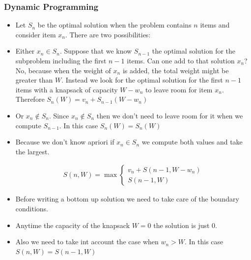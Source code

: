 \documentclass{beamer}
\begin{document}
\begin{frame}
  \frametitle{Dynamic Programming }
  \begin{itemize}
  \item Let $S_n$ be the optimal solution when the problem contains $n$ items and consider item $x_n$. There are two possibilities:
  \item Either $x_n\in S_n$. Suppose that we know $S_{n-1}$ the optimal solution for the subproblem including the first $n-1$ items. Can one add to that solution $x_n$?No, because when the weight of $x_n$ is added, the total weight might be greater than $W$. Instead we look for the optimal solution for the first $n-1$ items with a knapsack of capacity $W-w_n$ to leave room for item $x_n$. Therefore $S_n(W)=v_n+S_{n-1}(W-w_n)$
  \item Or $x_n\notin S_n$. Since $x_n\notin S_n$ then we don't need to leave room for it when we compute $S_{n-1}$. In this case $S_n(W)=S_n(W)$
  \end{itemize}
\end{frame}

\begin{frame}
  \begin{itemize}
  \item Because we don't know apriori if $x_n\in S_n$ we compute both values and take the largest.


    \begin{align*}
      S(n,W)=\max\left\{ \begin{aligned}v_n+S(n-1,W-w_n)\\S(n-1,W)\end{aligned}\right.
    \end{align*}
\item Before writing a bottom up solution we need to take care of the boundary conditions.
\item Anytime the capacity of the knapsack $W=0$ the solution is just $0$.
\item Also we need to take int account the case when $w_n> W$. In this case $S(n,W)=S(n-1,W)$
  \end{itemize}
\end{frame}

\begin{frame}
  
\begin{algorithm}[H]
   \DontPrintSemicolon
  \BlankLine
{}
\end{algorithm}
\end{frame}
\end{document}
